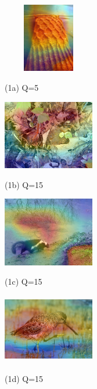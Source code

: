 \begin{figure}[htbp]
	\begin{minipage}{0.2\linewidth}
		\centerline{\includegraphics[width=4.0cm, height=3.0cm]{figures/robust_figure1.png}}
		\centerline{(1a) Q=5}
	\end{minipage}
	\hfill
	\begin{minipage}{0.2\linewidth}
		\centerline{\includegraphics[width=4.0cm, height=3.0cm]{figures/robust_figure2.png}}
		\centerline{(1b) Q=15}
	\end{minipage}
	\hfill
	\begin{minipage}{0.2\linewidth}
		\centerline{\includegraphics[width=4.0cm, height=3.0cm]{figures/robust_figure3.png}}
		\centerline{(1c) Q=15}
	\end{minipage}
	\hfill
	\begin{minipage}{0.2\linewidth}
		\centerline{\includegraphics[width=4.0cm, height=3.0cm]{figures/robust_figure4.png}}
		\centerline{(1d) Q=15}
	\end{minipage}
	
	\vfill
	\vspace{0.4cm}
	

\end{figure}
